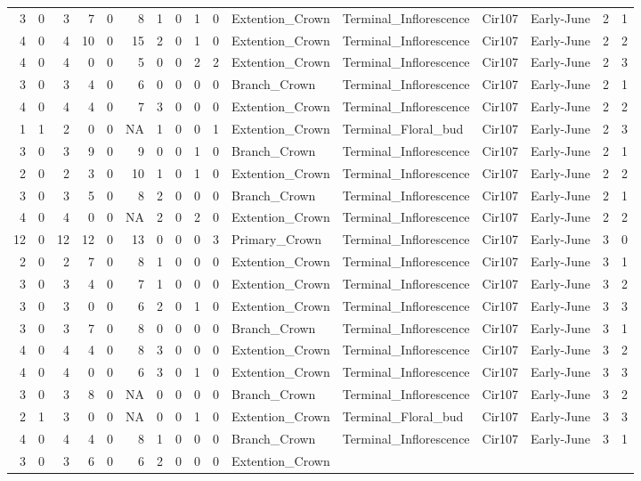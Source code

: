 \documentclass[]{article}
\begin{document}
\begin{longtable}[]{@{}rrrrrrrrrrllllrl@{}}
3 & 0 & 3 & 7 & 0 & 8 & 1 & 0 & 1 & 0 & Extention\_Crown &
Terminal\_Inflorescence & Cir107 & Early-June & 2 & 1\tabularnewline
4 & 0 & 4 & 10 & 0 & 15 & 2 & 0 & 1 & 0 & Extention\_Crown &
Terminal\_Inflorescence & Cir107 & Early-June & 2 & 2\tabularnewline
4 & 0 & 4 & 0 & 0 & 5 & 0 & 0 & 2 & 2 & Extention\_Crown &
Terminal\_Inflorescence & Cir107 & Early-June & 2 & 3\tabularnewline
3 & 0 & 3 & 4 & 0 & 6 & 0 & 0 & 0 & 0 & Branch\_Crown &
Terminal\_Inflorescence & Cir107 & Early-June & 2 & 1\tabularnewline
4 & 0 & 4 & 4 & 0 & 7 & 3 & 0 & 0 & 0 & Extention\_Crown &
Terminal\_Inflorescence & Cir107 & Early-June & 2 & 2\tabularnewline
1 & 1 & 2 & 0 & 0 & NA & 1 & 0 & 0 & 1 & Extention\_Crown &
Terminal\_Floral\_bud & Cir107 & Early-June & 2 & 3\tabularnewline
3 & 0 & 3 & 9 & 0 & 9 & 0 & 0 & 1 & 0 & Branch\_Crown &
Terminal\_Inflorescence & Cir107 & Early-June & 2 & 1\tabularnewline
2 & 0 & 2 & 3 & 0 & 10 & 1 & 0 & 1 & 0 & Extention\_Crown &
Terminal\_Inflorescence & Cir107 & Early-June & 2 & 2\tabularnewline
3 & 0 & 3 & 5 & 0 & 8 & 2 & 0 & 0 & 0 & Branch\_Crown &
Terminal\_Inflorescence & Cir107 & Early-June & 2 & 1\tabularnewline
4 & 0 & 4 & 0 & 0 & NA & 2 & 0 & 2 & 0 & Extention\_Crown &
Terminal\_Inflorescence & Cir107 & Early-June & 2 & 2\tabularnewline
12 & 0 & 12 & 12 & 0 & 13 & 0 & 0 & 0 & 3 & Primary\_Crown &
Terminal\_Inflorescence & Cir107 & Early-June & 3 & 0\tabularnewline
2 & 0 & 2 & 7 & 0 & 8 & 1 & 0 & 0 & 0 & Extention\_Crown &
Terminal\_Inflorescence & Cir107 & Early-June & 3 & 1\tabularnewline
3 & 0 & 3 & 4 & 0 & 7 & 1 & 0 & 0 & 0 & Extention\_Crown &
Terminal\_Inflorescence & Cir107 & Early-June & 3 & 2\tabularnewline
3 & 0 & 3 & 0 & 0 & 6 & 2 & 0 & 1 & 0 & Extention\_Crown &
Terminal\_Inflorescence & Cir107 & Early-June & 3 & 3\tabularnewline
3 & 0 & 3 & 7 & 0 & 8 & 0 & 0 & 0 & 0 & Branch\_Crown &
Terminal\_Inflorescence & Cir107 & Early-June & 3 & 1\tabularnewline
4 & 0 & 4 & 4 & 0 & 8 & 3 & 0 & 0 & 0 & Extention\_Crown &
Terminal\_Inflorescence & Cir107 & Early-June & 3 & 2\tabularnewline
4 & 0 & 4 & 0 & 0 & 6 & 3 & 0 & 1 & 0 & Extention\_Crown &
Terminal\_Inflorescence & Cir107 & Early-June & 3 & 3\tabularnewline
3 & 0 & 3 & 8 & 0 & NA & 0 & 0 & 0 & 0 & Branch\_Crown &
Terminal\_Inflorescence & Cir107 & Early-June & 3 & 2\tabularnewline
2 & 1 & 3 & 0 & 0 & NA & 0 & 0 & 1 & 0 & Extention\_Crown &
Terminal\_Floral\_bud & Cir107 & Early-June & 3 & 3\tabularnewline
4 & 0 & 4 & 4 & 0 & 8 & 1 & 0 & 0 & 0 & Branch\_Crown &
Terminal\_Inflorescence & Cir107 & Early-June & 3 & 1\tabularnewline
3 & 0 & 3 & 6 & 0 & 6 & 2 & 0 & 0 & 0 & Extention\_Crown &

\end{longtable}
\end{document}
